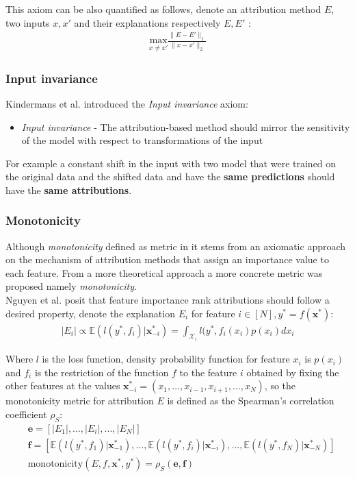 \documentclass[12pt]{report}
\begin{document}
This axiom can be also quantified as follows, denote an attribution method $E$, two inputs $x,x'$ and their explanations respectively $E,E'$ :
 \begin{align*}
	\underset{x \ne x'}{\text{max}} \frac{\| E-E'\|_1}{\| x-x'\|_2}
 \end{align*}

\subsubsection{Input invariance}

Kindermans et al. \cite{https://doi.org/10.48550/arxiv.1711.00867} introduced the \textit{Input invariance} axiom:
\begin{itemize}
	\item \textit{Input invariance} - The attribution-based method should mirror the sensitivity of the model with respect to transformations of the input
\end{itemize}

For example a constant shift in the input with two model that were trained on the original data and the shifted data and have the \textbf{same predictions} should have the \textbf{same attributions}. \\

\subsubsection{Monotonicity}

Although \textit{monotonicity} defined as metric in \cite{DBLP:journals/corr/abs-2007-07584} it stems from an axiomatic approach on the mechanism of attribution methods that assign an importance value to each feature. From a more theoretical approach a more concrete metric was proposed namely \textit{monotonicity}. \\

Nguyen et al. \cite{DBLP:journals/corr/abs-2007-07584}  posit that feature importance rank attributions should follow a desired property, denote the explanation $E_i$ for feature $i \in [N], y^* = f(\mathbf{x}^*)$:
 \begin{align*}
	|E_i| \propto \mathbb{E}(l(y^*, f_i)|\mathbf{x}^*_{-i}) = \int_{\mathcal{X}_i} l(y^*, f_i(x_i)p(x_i) d x_i
\end{align*}

Where $l$ is the loss function, density probability function for feature $x_i$ is $p(x_i)$ and $f_i$ is the restriction of the function $f$ to the feature $i$ obtained by fixing the other features at the values $\mathbf{x}^{*}_{-i} = (x_1, ..., x_{i-1}, x_{i+1} , ... , x_{N})$, so the monotonicity metric for attribution $E$ is defined as the Spearman’s
correlation coefficient $\rho_{S}$:
 \begin{align*}
 	&\mathbf{e} = [|E_1|, ..., |E_i|,..., |E_N|] \\
	&\mathbf{f}  =  [\mathbb{E}(l(y^*, f_1)|\mathbf{x}^*_{-1}), ..., \mathbb{E}(l(y^*, f_i)|\mathbf{x}^*_{-i}) ,..., \mathbb{E}(l(y^*, f_N)|\mathbf{x}^*_{-N})] \\
	&\text{monotonicity}(E,f, \mathbf{x}^*,y^*)   = \rho_{S}(\mathbf{e}, \mathbf{f})
\end{align*}
\end{document}
